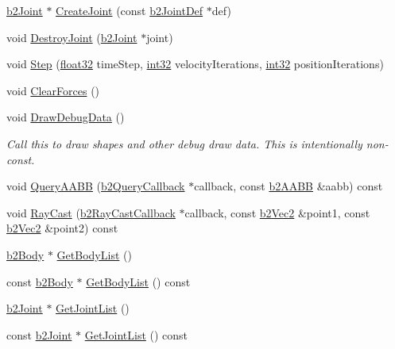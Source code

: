 \begin{DoxyCompactItemize}
\mbox{\hyperlink{classb2_joint}{b2\+Joint}} $\ast$ \mbox{\hyperlink{classb2_world_a5cba9d0653149eb62504154e6fb35021}{Create\+Joint}} (const \mbox{\hyperlink{structb2_joint_def}{b2\+Joint\+Def}} $\ast$def)
\item 
void \mbox{\hyperlink{classb2_world_add5942aef171e54cfa384c8975746dca}{Destroy\+Joint}} (\mbox{\hyperlink{classb2_joint}{b2\+Joint}} $\ast$joint)
\item 
void \mbox{\hyperlink{classb2_world_a7a8eff61af98461f978fe43f3af7be90}{Step}} (\mbox{\hyperlink{b2_settings_8h_aacdc525d6f7bddb3ae95d5c311bd06a1}{float32}} time\+Step, \mbox{\hyperlink{b2_settings_8h_a43d43196463bde49cb067f5c20ab8481}{int32}} velocity\+Iterations, \mbox{\hyperlink{b2_settings_8h_a43d43196463bde49cb067f5c20ab8481}{int32}} position\+Iterations)
\item 
void \mbox{\hyperlink{classb2_world_ac082ab4c4ad0b1c5ec4674315eeec643}{Clear\+Forces}} ()
\item 
void \mbox{\hyperlink{classb2_world_a293d9865e407fd463e168b0a29856acc}{Draw\+Debug\+Data}} ()
\begin{DoxyCompactList}\small\item\em Call this to draw shapes and other debug draw data. This is intentionally non-\/const. \end{DoxyCompactList}\item 
void \mbox{\hyperlink{classb2_world_ad169fae775be1e1f16386f7587786fa8}{Query\+A\+A\+BB}} (\mbox{\hyperlink{classb2_query_callback}{b2\+Query\+Callback}} $\ast$callback, const \mbox{\hyperlink{structb2_a_a_b_b}{b2\+A\+A\+BB}} \&aabb) const
\item 
void \mbox{\hyperlink{classb2_world_aa9955d94a254253997daaf16ce77bab6}{Ray\+Cast}} (\mbox{\hyperlink{classb2_ray_cast_callback}{b2\+Ray\+Cast\+Callback}} $\ast$callback, const \mbox{\hyperlink{structb2_vec2}{b2\+Vec2}} \&point1, const \mbox{\hyperlink{structb2_vec2}{b2\+Vec2}} \&point2) const
\item 
\mbox{\hyperlink{classb2_body}{b2\+Body}} $\ast$ \mbox{\hyperlink{classb2_world_a1b87c03955e3312d308ddf679adf3c85}{Get\+Body\+List}} ()
\item 
const \mbox{\hyperlink{classb2_body}{b2\+Body}} $\ast$ \mbox{\hyperlink{classb2_world_a8afde497a719bb1507fdfb474e79881a}{Get\+Body\+List}} () const
\item 
\mbox{\hyperlink{classb2_joint}{b2\+Joint}} $\ast$ \mbox{\hyperlink{classb2_world_a55db7240f8290aa02cab79f181934de8}{Get\+Joint\+List}} ()
\item 
const \mbox{\hyperlink{classb2_joint}{b2\+Joint}} $\ast$ \mbox{\hyperlink{classb2_world_af5f7feca7396ce10b905966a464177aa}{Get\+Joint\+List}} () const

\end{DoxyCompactItemize}
